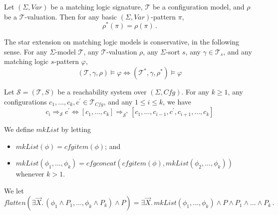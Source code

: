 \documentclass{article}
\newcommand{\Tcfg}{\mathcal{T}_{\mathit{Cfg}}}
\begin{document}
\begin{lemma}\label{lem:rhoStarOfPi}
    Let $(\Sigma, \mathit{Var})$ be a matching logic signature, $\mathcal{T}$ be a configuration model,
    and $\rho$ be a $\mathcal{T}$-valuation. Then for any basic $(\Sigma, \mathit{Var})$-pattern $\pi$,
    \begin{equation}
        \rho^*(\pi) = \rho(\pi) \, .
    \end{equation}
\end{lemma}

\begin{lemma}\label{lem:starConservative}
    The star extension on matching logic models is conservative, in the following sense.
    For any $\Sigma$-model $\mathcal{T}$, any $\mathcal{T}$-valuation $\rho$,
    any $\Sigma$-sort $s$,
    any $\gamma \in \mathcal{T}_s$,
    and any matching logic $s$-pattern $\varphi$,
    \begin{equation*}
        (\mathcal{T}, \gamma, \rho) \vDash \varphi \iff (\mathcal{T}^*, \gamma, \rho^*) \vDash \varphi
    \end{equation*}
\end{lemma}

\begin{lemma}\label{lem:compositeStep}
    Let $\mathcal{S} = (\mathcal{T}, S)$ be a reachability system over $(\Sigma, \mathit{Cfg})$.
    For any $k \geq 1$, any configurations $c_1,\ldots,c_k, c^\prime \in \Tcfg$, and any $1 \leq i \leq k$,
    we have
    \begin{equation*}
        c_i \Rightarrow_{\mathcal{S}} c^\prime
                    \iff
        [c_1,\ldots,c_k] \Rightarrow_{\mathcal{S}^*} [c_1, \ldots, c_{i-1}, c^\prime, c_{i+1}, \ldots, c_k]
    \end{equation*}
\end{lemma}


\begin{definition}\label{def:mkList}
We define $\mathit{mkList}$ by letting
\begin{itemize}
    \item $\mathit{mkList}(\phi) = \mathit{cfgitem}(\phi)$; and
    \item $\mathit{mkList}(\phi_1, \ldots, \phi_k) = \mathit{cfgconcat}(\mathit{cfgitem}(\phi), \mathit{mkList}(\phi_2, \ldots, \phi_k))$ whenever $k > 1$.
\end{itemize}
\end{definition}

\begin{definition}\label{def:flatten}
    We let
    \begin{equation*}
        \mathit{flatten}(\exists \vec{X}.\, (\phi_1 \land P_1,\ldots,\phi_k \land P_k) \land P)
        = \exists \vec{X}.\, \mathit{mkList}(\phi_1,\ldots,\phi_k) \land P \land P_1 \land \ldots \land P_k \, .
    \end{equation*}
\end{definition}
\end{document}
